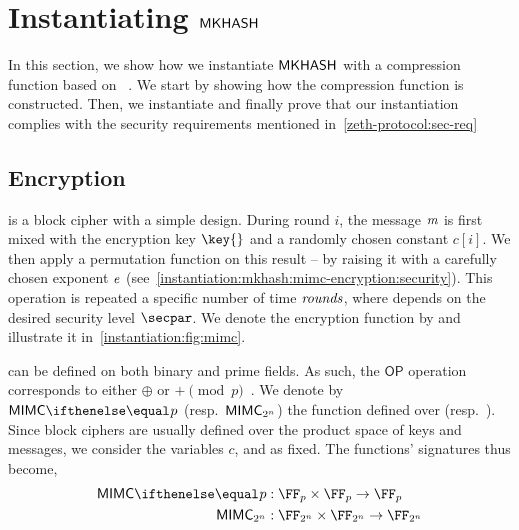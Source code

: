 
\section{Instantiating $\mathsf{MKHASH}$}\label{instantiation:mkhash}

In this section, we show how we instantiate $\mathsf{MKHASH}$ with a compression function based on \mimc{}~\cite{albrecht2016mimc}. We start by showing how the compression function is constructed. Then, we instantiate \mkhash and  finally prove that our instantiation complies with the security requirements mentioned in~\cref{zeth-protocol:sec-req}

\subsection{\mimc{} Encryption}\label{instantiation:mkhash:mimc-encryption}

\mimc{} is a block cipher with a simple design. During round $i$, the message $\mathit{m}$ is first mixed with the encryption key $\key{}$ and a randomly chosen constant $c[i]$. We then apply a permutation function on this result -- by raising it with a carefully chosen exponent $\mathit{e}{}$ (see~\cref{instantiation:mkhash:mimc-encryption:security}). This operation is repeated a specific number of time $\mathit{rounds}$, where \rounds{} depends on the desired security level $\secpar$. We denote the encryption function by \mimcEnc{} and illustrate it in~\cref{instantiation:fig:mimc}.

\begin{figure*}[ht]
    \centering
    \caption{\mimc{} Encryption function.}\label{instantiation:fig:mimc}
\end{figure*}

\mimcEnc{} can be defined on both binary and prime fields. As such, the $\mathsf{OP}$ operation corresponds to either $\oplus$ or $+ \pmod{p}$~\cite{albrecht2016mimc, grassi2016mpc}. We denote by $\mimcPrime{p}$ (resp.~$\mathsf{MIMC{}}_{2^n}$) the \mimcEnc{} function defined over  (resp.~). Since block ciphers are usually defined over the product space of keys and messages, we consider the variables $c$, \rounds{} and \exponent{} as fixed. The functions' signatures thus become,
\begin{align*}
    \mimcPrime{p} &: \FFx{p} \times \FFx{p} \to \FFx{p} \\
    \mimc{}_{2^n} &: \FFx{2^n} \times \FFx{2^n} \to \FFx{2^n}
\end{align*}


